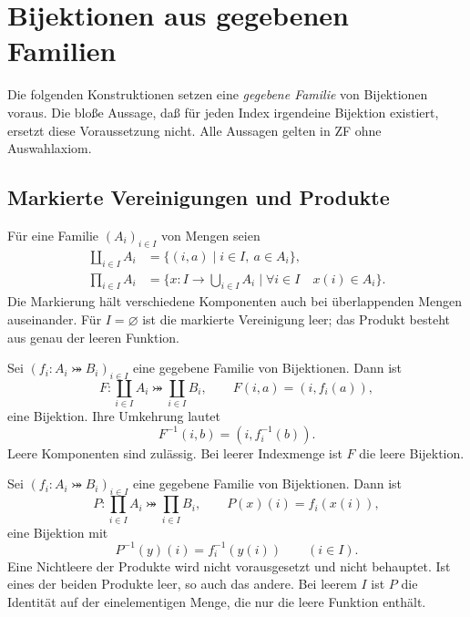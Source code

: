 \chapter{Bijektionen aus gegebenen Familien}
\label{b08guide:ch:constructions}

Die folgenden Konstruktionen setzen eine \emph{gegebene Familie}
von Bijektionen voraus. Die bloße Aussage, daß für jeden Index
irgendeine Bijektion existiert, ersetzt diese Voraussetzung nicht.
Alle Aussagen gelten in ZF ohne Auswahlaxiom.

\section{Markierte Vereinigungen und Produkte}

\begin{definition}
\label{b08guide:def:family-constructions}
Für eine Familie $(A_i)_{i\in I}$ von Mengen seien
\[
 \begin{aligned}
 \coprod_{i\in I}A_i
   &=\{(i,a)\mid i\in I,\ a\in A_i\},\\
 \prod_{i\in I}A_i
   &=\{x\colon I\to\bigcup_{i\in I}A_i\mid
                \forall i\in I\quad x(i)\in A_i\}.
 \end{aligned}
\]
Die Markierung hält verschiedene Komponenten auch bei
überlappenden Mengen auseinander. Für $I=\varnothing$ ist
die markierte Vereinigung leer; das Produkt besteht aus genau
der leeren Funktion.
\end{definition}

\begin{theorem}
\label{b08guide:thm:tagged-union}
Sei $(f_i\colon A_i\bij B_i)_{i\in I}$ eine gegebene Familie
von Bijektionen. Dann ist
\[
 F\colon\coprod_{i\in I}A_i\bij\coprod_{i\in I}B_i,
 \qquad F(i,a)=(i,f_i(a)),
\]
eine Bijektion. Ihre Umkehrung lautet
\[
 F^{-1}(i,b)=(i,f_i^{-1}(b)).
\]
Leere Komponenten sind zulässig. Bei leerer Indexmenge ist
$F$ die leere Bijektion.
\end{theorem}

\begin{theorem}
\label{b08guide:thm:family-product}
Sei $(f_i\colon A_i\bij B_i)_{i\in I}$ eine gegebene Familie
von Bijektionen. Dann ist
\[
 P\colon\prod_{i\in I}A_i\bij\prod_{i\in I}B_i,
 \qquad P(x)(i)=f_i(x(i)),
\]
eine Bijektion mit
\[
 P^{-1}(y)(i)=f_i^{-1}(y(i))\qquad(i\in I).
\]
Eine Nichtleere der Produkte wird nicht vorausgesetzt und nicht
behauptet. Ist eines der beiden Produkte leer, so auch das andere.
Bei leerem $I$ ist $P$ die Identität auf der einelementigen Menge,
die nur die leere Funktion enthält.
\end{theorem}

